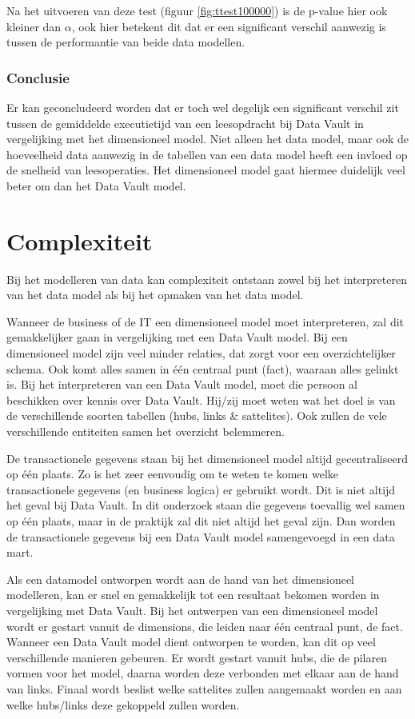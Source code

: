 Na het uitvoeren van deze test (figuur \ref{fig:ttest100000}) is de p-value hier ook kleiner dan $\alpha$, ook hier betekent dit dat er een significant verschil aanwezig is tussen de performantie van beide data modellen.

\subsubsection{Conclusie}
Er kan geconcludeerd worden dat er toch wel degelijk een significant verschil zit tussen de gemiddelde executietijd van een leesopdracht bij Data Vault in vergelijking met het dimensioneel model. Niet alleen het data model, maar ook de hoeveelheid data aanwezig in de tabellen van een data model heeft een invloed op de snelheid van leesoperaties. Het dimensioneel model gaat hiermee duidelijk veel beter om dan het Data Vault model. 

\section{Complexiteit}
Bij het modelleren van data kan complexiteit ontstaan zowel bij het interpreteren van het data model als bij het opmaken van het data model. 

Wanneer de business of de IT een dimensioneel model moet interpreteren, zal dit gemakkelijker gaan in vergelijking met een Data Vault model. Bij een dimensioneel model zijn veel minder relaties, dat zorgt voor een overzichtelijker schema. Ook komt alles samen in één centraal punt (fact), waaraan alles gelinkt is. Bij het interpreteren van een Data Vault model, moet die persoon al beschikken over kennis over Data Vault. Hij/zij moet weten wat het doel is van de verschillende soorten tabellen (hubs, links \& sattelites). Ook zullen de vele verschillende entiteiten samen het overzicht belemmeren. 

De transactionele gegevens staan bij het dimensioneel model altijd gecentraliseerd op één plaats. Zo is het zeer eenvoudig om te weten te komen welke transactionele gegevens (en business logica) er gebruikt wordt. Dit is niet altijd het geval bij Data Vault. In dit onderzoek staan die gegevens toevallig wel samen op één plaats, maar in de praktijk zal dit niet altijd het geval zijn. Dan worden de transactionele gegevens bij een Data Vault model samengevoegd in een data mart.

Als een datamodel ontworpen wordt aan de hand van het dimensioneel modelleren, kan er snel en gemakkelijk tot een resultaat bekomen worden in vergelijking met Data Vault. Bij het ontwerpen van een dimensioneel model wordt er gestart vanuit de dimensions, die leiden naar één centraal punt, de fact. Wanneer een Data Vault model dient ontworpen te worden, kan dit op veel verschillende manieren gebeuren. Er wordt gestart vanuit hubs, die de pilaren vormen voor het model, daarna worden deze verbonden met elkaar aan de hand van links. Finaal wordt beslist welke sattelites zullen aangemaakt worden en aan welke hubs/links deze gekoppeld zullen worden.

